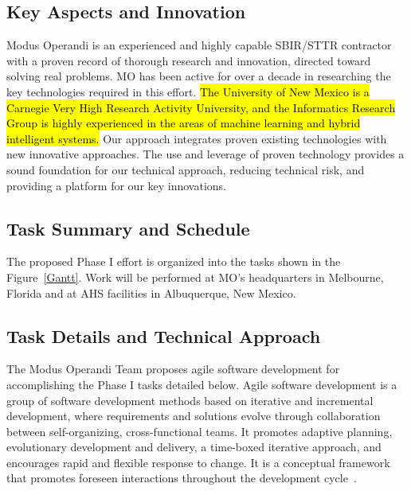 \documentclass{sbir}
\begin{document}
\subsection{Key Aspects and Innovation}
Modus Operandi is an experienced and highly capable SBIR/STTR contractor with a proven record of thorough research and innovation, directed toward solving real problems. MO has been active for over a decade in researching the key technologies required in this effort. \hl{The University of New Mexico is a Carnegie Very High Research Activity University, and the Informatics Research Group is highly experienced in the areas of machine learning and hybrid intelligent systems.} Our approach integrates proven existing technologies with new innovative approaches. The use and leverage of proven technology provides a sound foundation for our technical approach, reducing technical risk, and providing a platform for our key innovations.


\subsection{Task Summary and Schedule}
The proposed Phase I effort is organized into the tasks shown in the Figure~\ref{Gantt}. Work will be performed at MO's headquarters in Melbourne, Florida and at AHS facilities in Albuquerque, New Mexico.

\begin{center}
\end{center}

\subsection{Task Details and Technical Approach}
The Modus Operandi Team proposes agile software development for accomplishing the Phase I tasks detailed below. Agile software development is a group of software development methods based on iterative and incremental development, where requirements and solutions evolve through collaboration between self-organizing, cross-functional teams. It promotes adaptive planning, evolutionary development and delivery, a time-boxed iterative approach, and encourages rapid and flexible response to change. It is a conceptual framework that promotes foreseen interactions throughout the development cycle~\cite{La:03}.
\end{document}
